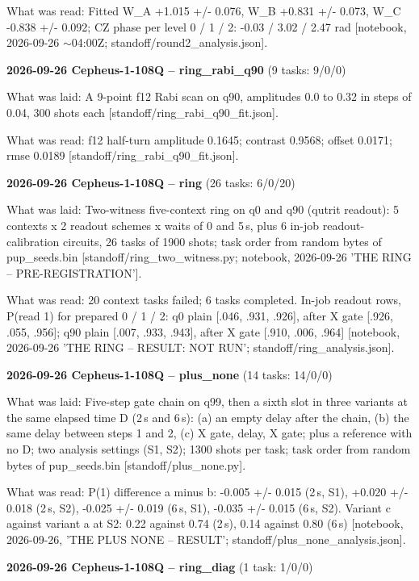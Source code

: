 \documentclass[11pt]{article}
\begin{document}
What was read: Fitted W\_A +1.015 +/- 0.076, W\_B +0.831 +/- 0.073, W\_C -0.838 +/- 0.092; CZ phase per level 0 / 1 / 2: -0.03 / 3.02 / 2.47 rad {[}notebook, 2026-09-26 \(\sim\)04:00Z; standoff/round2\_analysis.json{]}.

\textbf{2026-09-26 Cepheus-1-108Q -- ring\_rabi\_q90} (9 tasks: 9/0/0)

What was laid: A 9-point f12 Rabi scan on q90, amplitudes 0.0 to 0.32 in steps of 0.04, 300 shots each {[}standoff/ring\_rabi\_q90\_fit.json{]}.

What was read: f12 half-turn amplitude 0.1645; contrast 0.9568; offset 0.0171; rmse 0.0189 {[}standoff/ring\_rabi\_q90\_fit.json{]}.

\textbf{2026-09-26 Cepheus-1-108Q -- ring} (26 tasks: 6/0/20)

What was laid: Two-witness five-context ring on q0 and q90 (qutrit readout): 5 contexts x 2 readout schemes x waits of 0 and 5\,\textmu s, plus 6 in-job readout-calibration circuits, 26 tasks of 1900 shots; task order from random bytes of pup\_seeds.bin {[}standoff/ring\_two\_witness.py; notebook, 2026-09-26 'THE RING -- PRE-REGISTRATION'{]}.

What was read: 20 context tasks failed; 6 tasks completed. In-job readout rows, P(read 1) for prepared 0 / 1 / 2: q0 plain {[}.046, .931, .926{]}, after X gate {[}.926, .055, .956{]}; q90 plain {[}.007, .933, .943{]}, after X gate {[}.910, .006, .964{]} {[}notebook, 2026-09-26 'THE RING -- RESULT: NOT RUN'; standoff/ring\_analysis.json{]}.

\textbf{2026-09-26 Cepheus-1-108Q -- plus\_none} (14 tasks: 14/0/0)

What was laid: Five-step gate chain on q99, then a sixth slot in three variants at the same elapsed time D (2\,\textmu s and 6\,\textmu s): (a) an empty delay after the chain, (b) the same delay between steps 1 and 2, (c) X gate, delay, X gate; plus a reference with no D; two analysis settings (S1, S2); 1300 shots per task; task order from random bytes of pup\_seeds.bin {[}standoff/plus\_none.py{]}.

What was read: P(1) difference a minus b: -0.005 +/- 0.015 (2\,\textmu s, S1), +0.020 +/- 0.018 (2\,\textmu s, S2), -0.025 +/- 0.019 (6\,\textmu s, S1), -0.035 +/- 0.015 (6\,\textmu s, S2). Variant c against variant a at S2: 0.22 against 0.74 (2\,\textmu s), 0.14 against 0.80 (6\,\textmu s) {[}notebook, 2026-09-26, 'THE PLUS NONE -- RESULT'; standoff/plus\_none\_analysis.json{]}.

\textbf{2026-09-26 Cepheus-1-108Q -- ring\_diag} (1 task: 1/0/0)
\end{document}
